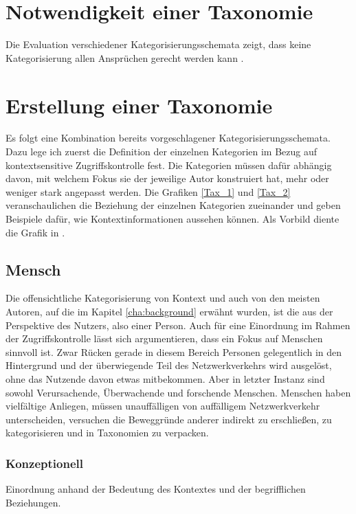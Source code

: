 \section{Notwendigkeit einer Taxonomie}
Die Evaluation verschiedener Kategorisierungsschemata zeigt, dass keine Kategorisierung allen Ansprüchen gerecht werden kann \cite{perera_context_2014}.
\section{ Erstellung einer Taxonomie }
Es folgt eine Kombination bereits vorgeschlagener Kategorisierungsschemata. Dazu lege ich zuerst die Definition der einzelnen Kategorien im Bezug auf kontextsensitive Zugriffskontrolle fest. Die Kategorien müssen dafür abhängig davon, mit welchem Fokus sie der jeweilige Autor konstruiert hat, mehr oder weniger stark angepasst werden.
Die Grafiken \ref{Tax_1} und \ref{Tax_2} veranschaulichen die Beziehung der einzelnen Kategorien zueinander und geben Beispiele dafür, wie Kontextinformationen aussehen können. Als Vorbild diente die Grafik in \cite{perera_context_2014}. 
\subsection{Mensch}
Die offensichtliche Kategorisierung von Kontext und auch von den meisten Autoren, auf die im Kapitel \ref{cha:background} erwähnt wurden, ist die aus der Perspektive des Nutzers, also einer Person. Auch für eine Einordnung im Rahmen der Zugriffskontrolle lässt sich argumentieren, dass ein Fokus auf Menschen sinnvoll ist. Zwar Rücken gerade in diesem Bereich Personen gelegentlich in den Hintergrund und der überwiegende Teil des Netzwerkverkehrs wird ausgelöst, ohne das Nutzende davon etwas mitbekommen. Aber in letzter Instanz sind sowohl Verursachende, Überwachende und forschende Menschen. Menschen haben vielfältige Anliegen, müssen unauffälligen von auffälligem Netzwerkverkehr unterscheiden, versuchen die Beweggründe anderer indirekt zu erschließen, zu kategorisieren und in Taxonomien zu verpacken.

\subsubsection{Konzeptionell}
Einordnung anhand der Bedeutung des Kontextes und der begrifflichen Beziehungen.

